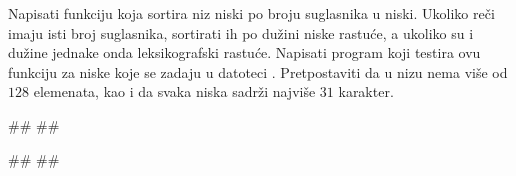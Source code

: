 \begin{Exercise}[label=3_22]
  Napisati funkciju koja sortira niz niski po broju suglasnika u
  niski. Ukoliko reči imaju isti broj suglasnika, sortirati ih po
  dužini niske rastuće, a ukoliko su i dužine jednake onda
  leksikografski rastuće. Napisati program koji testira ovu funkciju za niske
  koje se zadaju u datoteci .  Pretpostaviti da u
  nizu nema više od $128$ elemenata, kao i da svaka niska sadrži
  najviše $31$ karakter.
  
\begin{maxitest}
\begin{test}{1}
##
##
  
#\naslovIzlaz#
##
\end{test}
\end{maxitest}
  
\end{Exercise}

